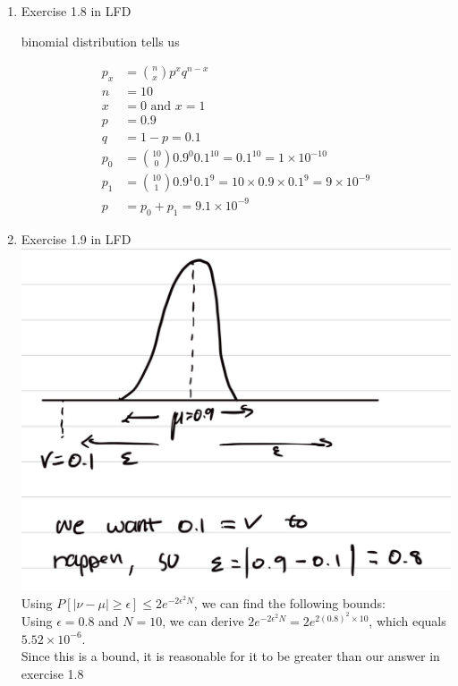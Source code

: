 \documentclass{article}
\begin{document}
    \begin{enumerate}
        \item Exercise 1.8 in LFD
        \begin{center}
            binomial distribution tells us
        \end{center}
        \begin{align*}
            p_x &= {n \choose x} p^x q^{n-x}\\
            n &= 10\\
            x &= 0 \text{ and } x = 1\\
            p &= 0.9\\
            q &= 1 - p = 0.1\\
            p_0 &= {10 \choose 0} 0.9^0 0.1^{10} = 0.1^{10} = 1 \times 10^{-10}\\
            p_1 &= {10 \choose 1} 0.9^1 0.1^9 = 10 \times 0.9 \times 0.1^9 = 9 \times 10^{-9}\\
            p&= p_0 + p_1 = 9.1 \times 10^{-9}
        \end{align*}

        \item Exercise 1.9 in LFD\\[0.25in]
        \includegraphics[scale=0.2]{images/1.9.jpg}\\[0.25in]
        Using $P[ |\nu - \mu| \geq \epsilon] \leq 2e^{-2\epsilon^2N}$, we can find the following bounds:\\
        Using $\epsilon = 0.8$ and $N = 10$, we can derive $2e^{-2\epsilon^2N} = 2e^{2(0.8)^2 \times 10}$, which equals $5.52 \times 10^{-6}$.\\
        Since this is a bound, it is reasonable for it to be greater than our answer in exercise 1.8


\end{enumerate}
\end{document}
